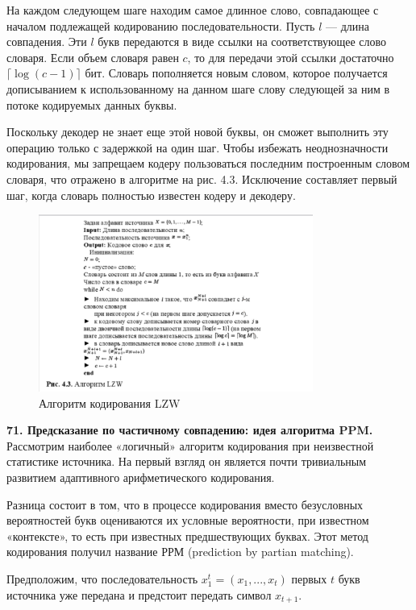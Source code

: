 \documentclass[14pt]{article}
\begin{document}
На каждом следующем шаге находим самое длинное слово, совпадающее с началом подлежащей кодированию последовательности. Пусть \(l\) — длина совпадения. Эти \(l\) букв передаются в виде ссылки на соответствующее слово словаря. Если объем словаря равен \(c\), то для передачи этой ссылки достаточно \(\lceil \log(c - 1) \rceil\) бит. Словарь пополняется новым словом, которое получается дописыванием к использованному на данном шаге слову следующей за ним в потоке кодируемых данных буквы.

Поскольку декодер не знает еще этой новой буквы, он сможет выполнить эту операцию только с задержкой на один шаг. Чтобы избежать неоднозначности кодирования, мы запрещаем кодеру пользоваться последним построенным словом словаря, что отражено в алгоритме на рис. 4.3. Исключение составляет первый шаг, когда словарь полностью известен кодеру и декодеру.

\begin{figure}[t!]
\centering
    \includegraphics[width=90mm]{lzw_alg.png}
\caption{Алгоритм кодирования LZW}
\end{figure}

\bigskip
\textbf{71. Предсказание по частичному совпадению: идея алгоритма PPM.} \\

Рассмотрим наиболее «логичный» алгоритм кодирования при неизвестной статистике источника. На первый взгляд он является почти тривиальным развитием адаптивного арифметического кодирования.

Разница состоит в том, что в процессе кодирования вместо безусловных вероятностей букв оцениваются их условные вероятности, при известном «контексте», то есть при известных предшествующих буквах. Этот метод кодирования получил название РРМ (prediction by partian matching).

Предположим, что последовательность \(x_1^t = (x_1, ... , x_t)\) первых \(t\) букв источника уже передана и предстоит передать символ \(x_{t+1}\).
\end{document}
